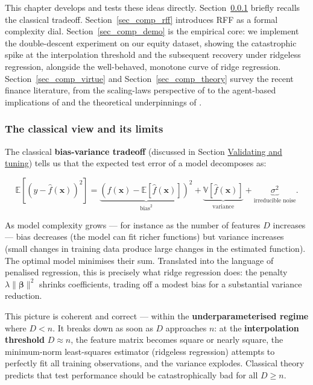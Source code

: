 This chapter develops and tests these ideas directly. Section~\ref{sec_comp_classical} briefly recalls the classical tradeoff. Section~\ref{sec_comp_rff} introduces RFF as a formal complexity dial. Section~\ref{sec_comp_demo} is the empirical core: we implement the double-descent experiment on our equity dataset, showing the catastrophic spike at the interpolation threshold and the subsequent recovery under ridgeless regression, alongside the well-behaved, monotone curve of ridge regression. Section~\ref{sec_comp_virtue} and Section~\ref{sec_comp_theory} survey the recent finance literature, from the scaling-laws perspective of \cite{timmermann2026compute} to the agent-based implications of \cite{molavi2024model} and the theoretical underpinnings of \cite{fallahgoul2025learning}.

\subsubsection{The classical view and its limits}\label{sec_comp_classical}

The classical \textbf{bias-variance tradeoff} (discussed in Section \href{/chap-13-validating-tuning}{Validating and tuning}) tells us that the expected test error of a model decomposes as:

\begin{equation}
\label{eq-biasvar}
\mathbb{E}\left[(y - \hat{f}(\mathbf{x}))^2\right] = \underbrace{\left(f(\mathbf{x}) - \mathbb{E}[\hat{f}(\mathbf{x})]\right)^2}_{\text{bias}^2} + \underbrace{\mathbb{V}[\hat{f}(\mathbf{x})]}_{\text{variance}} + \underbrace{\sigma^2}_{\text{irreducible noise}}.
\end{equation}

As model complexity grows --- for instance as the number of features $D$ increases --- bias decreases (the model can fit richer functions) but variance increases (small changes in training data produce large changes in the estimated function). The optimal model minimises their sum. Translated into the language of penalised regression, this is precisely what ridge regression does: the penalty $\lambda \|\boldsymbol{\beta}\|^2$ shrinks coefficients, trading off a modest bias for a substantial variance reduction.

This picture is coherent and correct --- within the \textbf{underparameterised regime} where $D < n$. It breaks down as soon as $D$ approaches $n$: at the \textbf{interpolation threshold} $D \approx n$, the feature matrix becomes square or nearly square, the minimum-norm least-squares estimator (ridgeless regression) attempts to perfectly fit all training observations, and the variance explodes. Classical theory predicts that test performance should be catastrophically bad for all $D \geq n$.


